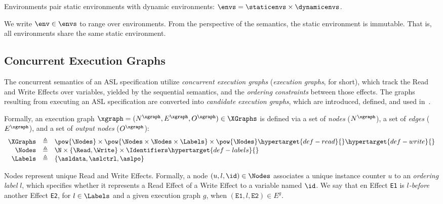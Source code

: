 \hypertarget{def-envs}{}
\begin{definition}[Environments]
Environments pair static environments with dynamic environments:
$\envs = \staticenvs \times \dynamicenvs$.
\end{definition}
\hypertarget{def-env}{}
We write $\env \in \envs$ to range over environments.
%
From the perspective of the semantics, the static environment is immutable.
That is, all environments share the same static environment.

\subsection{Concurrent Execution Graphs\label{sec:concurrentexecutiongraphs}}

The concurrent semantics of an ASL specification utilize \emph{concurrent execution graphs}
(\emph{execution graphs}, for short),
which track the Read and Write Effects over variables, yielded by the sequential semantics,
and the \emph{ordering constraints} between those effects.
The graphs resulting from executing an ASL specification are converted into
\emph{candidate execution graphs}, which are introduced, defined,
and used in~\cite{AlglaveMT14,alglave2016syntax,AlglaveDGHM21}.

\hypertarget{def-xgraphs}{}
Formally, an execution graph $\xgraph = (N^\xgraph, E^\xgraph, O^\xgraph) \in \XGraphs$
is defined via a set of \emph{nodes} ($N^\xgraph$), a set of \emph{edges} ($E^\xgraph$), and a set of \emph{output nodes} ($O^\xgraph$):
\hypertarget{def-nodes}{}
\[
\begin{array}{rcl}
\XGraphs &\triangleq& \pow{\Nodes} \times \pow{\Nodes \times \Nodes \times \Labels} \times \pow{\Nodes}  \hypertarget{def-read}{}\hypertarget{def-write}{}\\
\Nodes   &\triangleq& \N \times \{ \Read, \Write \} \times \Identifiers \hypertarget{def-labels}{}\\
\Labels  &\triangleq& \{ \asldata, \aslctrl, \aslpo \}
\end{array}
\]

Nodes represent unique Read and Write Effects. Formally, a node $(u,l,\id) \in \Nodes$ associates a unique instance counter $u$
to an \emph{ordering label} $l$, which specifies whether it represents a Read Effect of a Write Effect to a variable named $\id$.
%
We say that en Effect \texttt{E1} is \emph{$l$-before} another Effect \texttt{E2}, for $l\in \Labels$ and a given execution graph
$g$, when $(\texttt{E1}, l, \texttt{E2}) \in E^g$.

